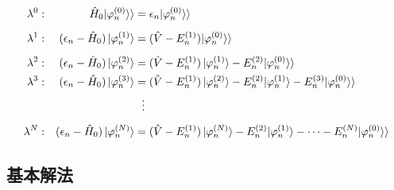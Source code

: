 \begin{align}
\label{pereq0}
\lambda^0&:&\hat{H}_0|\varphi^{(0)}_n\rangle\rangle &=\epsilon_n|\varphi^{(0)}_n\rangle\rangle \\[5pt]
%
\label{pereq1}
\lambda^1&:&(\epsilon_n-\hat{H}_0)\ket{\varphi^{(1)}_n}
&=(\hat{V}-E^{(1)}_n)|\varphi^{(0)}_n\rangle\rangle\\[5pt]
%
\label{pereq2}
\lambda^2&:&(\epsilon_n-\hat{H}_0)\ket{\varphi^{(2)}_n}
&=(\hat{V}-E^{(1)}_n)\ket{\varphi^{(1)}_n}-E^{(2)}_n|\varphi^{(0)}_n\rangle\rangle\\
%
\label{pereq3}
\lambda^3&:&(\epsilon_n-\hat{H}_0)\ket{\varphi^{(3)}_n}
&=(\hat{V}-E^{(1)}_n)\ket{\varphi^{(2)}_n}-E^{(2)}_n|\varphi^{(1)}_n\rangle-E^{(3)}_n|\varphi^{(0)}_n\rangle\rangle\\
& & &\ \ \vdots\nn[5pt]
%
\label{pereqN}
\lambda^N&:&(\epsilon_n-\hat{H}_0)\ket{\varphi^{(N)}_n}
&=(\hat{V}-E^{(1)}_n)\ket{\varphi^{(N)}_n}-E^{(2)}_n|\varphi^{(1)}_n\rangle-\cdots-E^{(N)}_n|\varphi^{(0)}_n\rangle\rangle
\end{align}


\subsection{基本解法}






